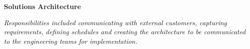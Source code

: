 
\textbf{Solutions Architecture}{ \emph{ Responsibilities included communicating
    with external customers, capturing requirements, defining schedules and
    creating the architecture to be communicated to the engineering teams for
    implementation. }

}

